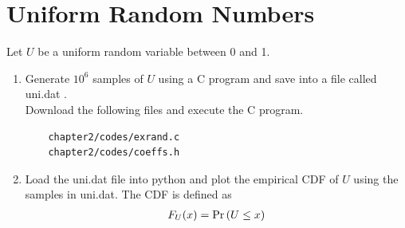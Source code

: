 \section{Uniform Random Numbers}
Let $U$ be a uniform random variable between 0 and 1.
\begin{enumerate}
\item Generate $10^6$ samples of $U$ using a C program and save into a file called uni.dat .
\label{prob:uni_gen}
\\
\solution Download the following files and execute the  C program.
\begin{lstlisting}
	chapter2/codes/exrand.c
    chapter2/codes/coeffs.h
\end{lstlisting}

%
\item
Load the uni.dat file into python and plot the empirical CDF of $U$ using the samples in uni.dat. The CDF is defined as
\begin{align}
F_{U}(x) = \Pr\left(U \le x\right)
\end{align}


\end{enumerate}

